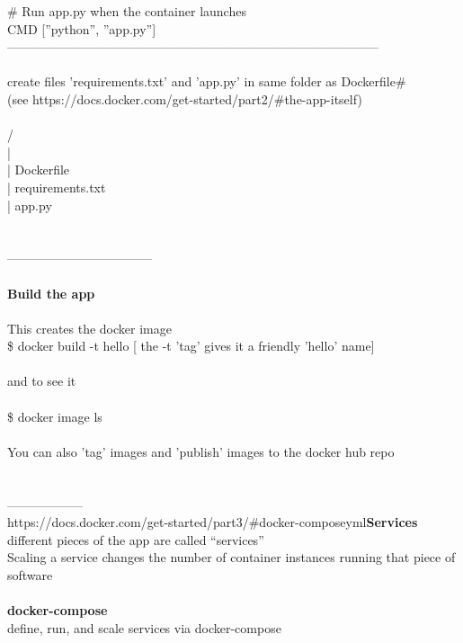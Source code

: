 \documentclass[10pt,a4paper]{article}
\begin{document}
{{{{{{{{{\# Run app.py when the container launches\\
CMD [''python'', ''app.py'']\\
-----------------------------------------------------------------------------------------\\
\\
create files  'requirements.txt'  and  'app.py' in same folder as Dockerfile\#\\
(see https://docs.docker.com/get-started/part2/\#the-app-itself}{\large  )\\
\\
/\\
	|\\
	| Dockerfile\\
	| requirements.txt\\
	| app.py\\
\\
\\
-----------------------------------\\
\\
\textbf{Build the app}}{\large \\
\\
This creates the docker image\\
\$ docker build -t hello    [ the -t 'tag' gives it a friendly 'hello' name]\\
\\
and to see it\\
\\
\$ docker image ls\\
\\
You can also 'tag' images and 'publish' images to the docker hub repo\\
\\
\\
------------------\\
}https://docs.docker.com/get-started/part3/\#docker-composeyml{\large \textbf{Services}}{\large \\
different pieces of the app are called ``services''\\
Scaling a service changes the number of container instances running that piece of software\\
\textbf{\\
docker-compose}}{\large \\
define, run, and scale services via docker-compose\\
[this example assumes have published above Dockerfile first for 'image:username/repo:tag' to work]\\
}}}}}}}}}
\end{document}
